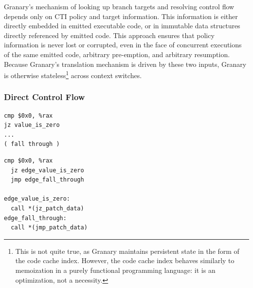 \documentclass[preprint]{sigplanconf}
\begin{document}
Granary's mechanism of looking up branch targets and resolving control flow depends only on CTI policy and target information. This information is either directly embedded in emitted executable code, or in immutable data structures directly referenced by emitted code. This approach ensures that policy information is never lost or corrupted, even in the face of concurrent executions of the same emitted code, arbitrary pre-emption, and arbitrary resumption. Because Granary's translation mechanism is driven by these two inputs, Granary is otherwise stateless\footnote{This is not quite true, as Granary maintains persistent state in the form of the code cache index. However, the code cache index behaves similarly to memoization in a purely functional programming language: it is an optimization, not a necessity.} across context switches.

\subsubsection{Direct Control Flow}
\lstset{language=[x64]Assembler}
\newsavebox\nativejcc
\begin{lrbox}{\nativejcc}
\begin{minipage}[b]{4cm}
\begin{lstlisting}[basicstyle=\scriptsize\ttfamily]
cmp $0x0, %rax
jz value_is_zero 
...
( fall through )
\end{lstlisting}
\end{minipage}
\end{lrbox}

\newsavebox\translatedjcc
\begin{lrbox}{\translatedjcc}\begin{minipage}[b]{4cm}\begin{lstlisting}[basicstyle=\scriptsize\ttfamily]
  cmp $0x0, %rax
  jz edge_value_is_zero
  jmp edge_fall_through

edge_value_is_zero:
  call *(jz_patch_data)
edge_fall_through:
  call *(jmp_patch_data)
\end{lstlisting}
\end{minipage}
\end{lrbox}
\end{document}
